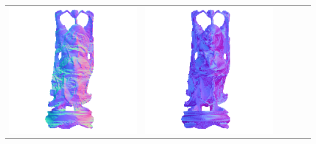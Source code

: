 \begin{center}
\begin{tabularx}{\linewidth}{@{}Y@{}Y@{}Y@{}Y@{}Y@{}Y@{}}
\includegraphics[width=\linewidth]{semisynthetic/20160617_20_yu_out.png} &
\includegraphics[width=\linewidth]{semisynthetic/20160617_20_dpsn_out.png} &

\end{tabularx}
\end{center}
